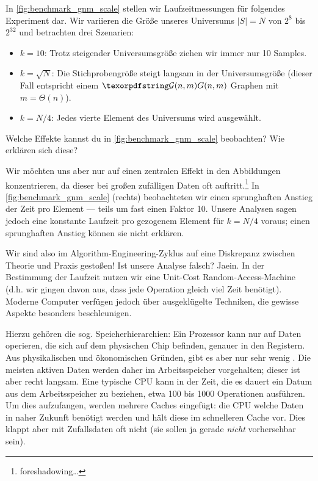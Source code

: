In \cref{fig:benchmark_gnm_scale} stellen wir Laufzeitmessungen für folgendes Experiment dar.
Wir variieren die Größe unseres Universums $|S| = N$ von $2^8$ bis $2^{32}$ und betrachten drei Szenarien:
\begin{itemize}
    \item $k=10$: Trotz steigender Universumsgröße ziehen wir immer nur 10 Samples.
    \item $k=\sqrt{N}$: Die Stichprobengröße steigt langsam in der Universumsgröße (dieser Fall entspricht einem $\Gnm$ Graphen mit $m = \Theta(n)$).
    \item $k=N/4$: Jedes vierte Element des Universums wird ausgewählt.
\end{itemize}

\begin{exercise}
    Welche Effekte kannst du in \cref{fig:benchmark_gnm_scale} beobachten? Wie erklären sich diese?
\end{exercise}

Wir möchten uns aber nur auf einen zentralen Effekt in den Abbildungen konzentrieren, da dieser bei großen zufälligen Daten oft auftritt.\footnote{foreshadowing\ldots}
In \cref{fig:benchmark_gnm_scale} (rechts) beobachteten wir einen sprunghaften Anstieg der Zeit pro Element --- teils um fast einen Faktor 10.
Unsere Analysen sagen jedoch eine konstante Laufzeit pro gezogenem Element für $k = N/4$ voraus; einen sprunghaften Anstieg können sie nicht erklären.

Wir sind also im Algorithm-Engineering-Zyklus auf eine Diskrepanz zwischen Theorie und Praxis gestoßen!
Ist unsere Analyse falsch? Jaein.
In der Bestimmung der Laufzeit nutzen wir eine Unit-Cost Random-Access-Machine (d.h. wir gingen davon aus, dass jede Operation gleich viel Zeit benötigt).
Moderne Computer verfügen jedoch über ausgeklügelte Techniken, die gewisse Aspekte besonders beschleunigen.

Hierzu gehören die sog. Speicherhierarchien: Ein Prozessor kann nur auf Daten operieren, die sich auf dem physischen Chip befinden, genauer in den Registern.
Aus physikalischen und ökonomischen Gründen, gibt es aber nur sehr wenig .
Die meisten aktiven Daten werden daher im Arbeitsspeicher vorgehalten; dieser ist aber recht langsam.
Eine typische CPU kann in der Zeit, die es dauert ein Datum aus dem Arbeitsspeicher zu beziehen, etwa 100 bis 1000 Operationen ausführen.
Um dies aufzufangen, werden mehrere Caches eingefügt: die CPU  welche Daten in naher Zukunft benötigt werden und hält diese im schnelleren Cache vor.
Dies klappt aber mit Zufallsdaten oft nicht (sie sollen ja gerade \emph{nicht} vorhersehbar sein).

